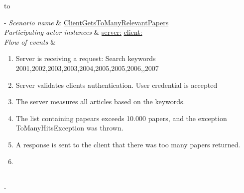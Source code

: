 \begin{table}[h!]

	\tabulinesep=1.5mm
	
	\begin{tabu} to 
	
		\tabucline[1.5pt]-
		\textit{Scenario name} & \underline{ClientGetsToManyRelevantPapers} \\
		\hline
		\textit{Participating actor \newline instances} & \underline{server:\serverside}
		\newline \underline{client:\clientside} \\
		\hline
		\textit{Flow of events} &
		\vspace{-3mm}
		
		\begin{enumerate}[leftmargin=*,topsep=0pt,itemsep=-1ex]
		
			\item Server is receiving a request: Search keywords {2001,2002,2003,2003,2004,2005,2005,2006,,2007}
						
			\item Server validates clients authentication. User credential is accepted
			
			\item The server measures all articles based on the keywords.
			
			\item The list containing papears exceeds 10.000 papers, and the exception ToManyHitsException was thrown.
			
			\item A response is sent to the client that there was too many papers returned.
			\item \\
						
		\end{enumerate} \\
		
		\tabucline[1.5pt]-
		
	\end{tabu}
	
	\caption{Scenario when a user has requested to many papers during one request.}
	\label{sc:ClientGetsToManyRelevantPapers}
	
\end{table}


